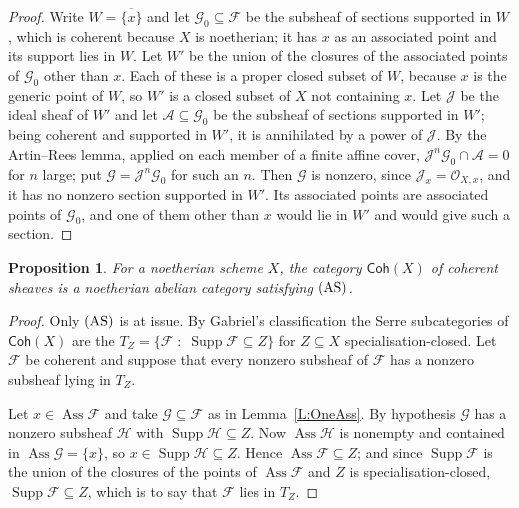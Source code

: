 \documentclass[reqno,a4paper]{amsart}
\numberwithin{equation}{section}
\theoremstyle{plain}
\newtheorem{proposition}[subsection]{Proposition}
\theoremstyle{definition}
\def\nameit#1{\textrm{#1}~}
\def\lemx{\nameit{Lemma}}
\newcommand{\ov}[1]{\overline{#1}}
\newcommand{\onecat}[1]{\ensuremath{\mathsf{#1}}\xspace}
\renewcommand{\1}{\onecat{1}}
\newcommand{\Coh}{\onecat{Coh}}
\DeclareMathOperator{\Supp}{Supp}
\DeclareMathOperator{\Ass}{Ass}
\newcommand{\AS}{\textup{(AS)}}
\begin{document}
\begin{proof}
	Write \(W=\ov{\{x\}}\) and let \(\mathcal{G}_{0}\subseteq\mathcal{F}\) be the subsheaf of sections supported in \(W\), which is coherent because \(X\) is noetherian; it has \(x\) as an associated point and its support lies in \(W\). Let \(W'\) be the union of the closures of the associated points of \(\mathcal{G}_{0}\) other than \(x\). Each of these is a proper closed subset of \(W\), because \(x\) is the generic point of \(W\), so \(W'\) is a closed subset of \(X\) not containing \(x\). Let \(\mathcal{J}\) be the ideal sheaf of \(W'\) and let \(\mathcal{A}\subseteq\mathcal{G}_{0}\) be the subsheaf of sections supported in \(W'\); being coherent and supported in \(W'\), it is annihilated by a power of \(\mathcal{J}\). By the Artin--Rees lemma, applied on each member of a finite affine cover, \(\mathcal{J}^{n}\mathcal{G}_{0}\cap\mathcal{A}=0\) for \(n\) large; put \(\mathcal{G}=\mathcal{J}^{n}\mathcal{G}_{0}\) for such an \(n\). Then \(\mathcal{G}\) is nonzero, since \(\mathcal{J}_{x}=\mathcal{O}_{X,x}\), and it has no nonzero section supported in \(W'\). Its associated points are associated points of \(\mathcal{G}_{0}\), and one of them other than \(x\) would lie in \(W'\) and would give such a section.
\end{proof}

\begin{proposition}\label{P:CohAS}
	For a noetherian scheme \(X\), the category \(\Coh(X)\) of coherent sheaves is a noetherian abelian category satisfying \(\AS\).
\end{proposition}

\begin{proof}
	Only \(\AS\) is at issue. By Gabriel's classification \cite[Proposition~VI.2.4]{Gabriel62} the Serre subcategories of \(\Coh(X)\) are the \(T_{Z}=\{\mathcal{F}\;:\;\Supp\mathcal{F}\subseteq Z\}\) for \(Z\subseteq X\) specialisation-closed. Let \(\mathcal{F}\) be coherent and suppose that every nonzero subsheaf of \(\mathcal{F}\) has a nonzero subsheaf lying in \(T_{Z}\).

	Let \(x\in\Ass\mathcal{F}\) and take \(\mathcal{G}\subseteq\mathcal{F}\) as in \lemx\ref{L:OneAss}. By hypothesis \(\mathcal{G}\) has a nonzero subsheaf \(\mathcal{H}\) with \(\Supp\mathcal{H}\subseteq Z\). Now \(\Ass\mathcal{H}\) is nonempty and contained in \(\Ass\mathcal{G}=\{x\}\), so \(x\in\Supp\mathcal{H}\subseteq Z\). Hence \(\Ass\mathcal{F}\subseteq Z\); and since \(\Supp\mathcal{F}\) is the union of the closures of the points of \(\Ass\mathcal{F}\) \cite[Tag~05AL]{Stacks} and \(Z\) is specialisation-closed, \(\Supp\mathcal{F}\subseteq Z\), which is to say that \(\mathcal{F}\) lies in \(T_{Z}\).
\end{proof}
\end{document}

